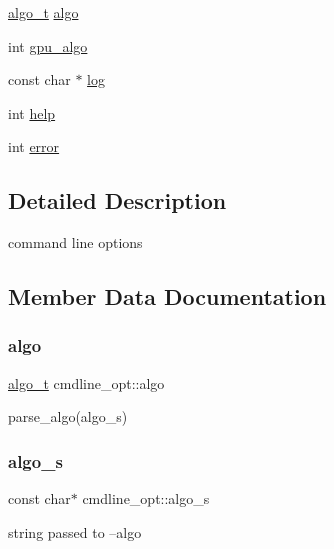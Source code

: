 \begin{DoxyCompactItemize}
\item 
\hyperlink{vgg__util_8h_ae1267137aba8cc25a02220492efa7d3c}{algo\+\_\+t} \hyperlink{structcmdline__opt_a4506cc13417cfb1379411fb497ae3c39}{algo}
\item 
int \hyperlink{structcmdline__opt_acb8b225214983d009415a26f2e45eb65}{gpu\+\_\+algo}
\item 
const char $\ast$ \hyperlink{structcmdline__opt_a0ecd10b9b45fb70719fb85fff85469ad}{log}
\item 
int \hyperlink{structcmdline__opt_afcc6982691bd1f6dfac42dbf423f9ead}{help}
\item 
int \hyperlink{structcmdline__opt_a500dde11d2a0ee2e4dff8e4144083556}{error}
\end{DoxyCompactItemize}


\subsection{Detailed Description}
command line options 

\subsection{Member Data Documentation}
\mbox{\label{structcmdline__opt_a4506cc13417cfb1379411fb497ae3c39}} 
\subsubsection{\texorpdfstring{algo}{algo}}
{\footnotesize\ttfamily \hyperlink{vgg__util_8h_ae1267137aba8cc25a02220492efa7d3c}{algo\+\_\+t} cmdline\+\_\+opt\+::algo}

parse\+\_\+algo(algo\+\_\+s) \mbox{\label{structcmdline__opt_aa5b05fde2a12fcab6f9ce0baf3e29d29}} 
\subsubsection{\texorpdfstring{algo\+\_\+s}{algo\_s}}
{\footnotesize\ttfamily const char$\ast$ cmdline\+\_\+opt\+::algo\+\_\+s}

string passed to --algo \mbox{\label{structcmdline__opt_a417b11f5b6a5213e293ce930a471a786}} 
